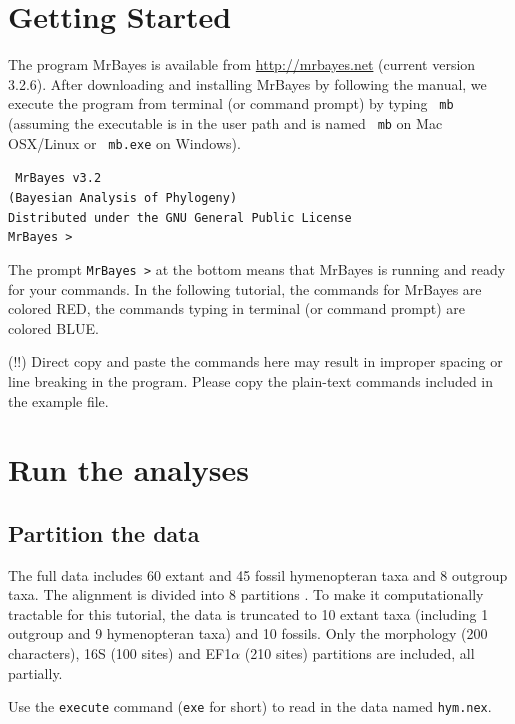 \documentclass[12pt]{article}
\begin{document}
\section{Getting Started}

The program MrBayes is available from \url{http://mrbayes.net} (current version 3.2.6).
After downloading and installing MrBayes by following the manual, we execute the program from terminal (or command prompt) by typing {\tt \color{blue} mb}
(assuming the executable is in the user path and is named {\tt \color{blue} mb} on Mac OSX/Linux or {\tt \color{blue} mb.exe} on Windows).

{\tt \center
                        MrBayes v3.2 \\
               (Bayesian Analysis of Phylogeny)\\
        Distributed under the GNU General Public License\\
MrBayes >
}

The prompt {\tt MrBayes >} at the bottom means that MrBayes is running and ready for your commands.
In the following tutorial, the commands for MrBayes are colored {\color{red} RED}, the commands typing in terminal (or command prompt) are colored {\color{blue} BLUE}.

{\noindent \color{red} (!!)}
Direct copy and paste the commands here may result in improper spacing or line breaking in the program. Please copy the plain-text commands included in the example file.

\section{Run the analyses}
\subsection{Partition the data}

The full data includes 60 extant and 45 fossil hymenopteran taxa and 8 outgroup taxa. The alignment is divided into 8 partitions \citep{Ronquist:2012ea}.
To make it computationally tractable for this tutorial, the data is truncated to 10 extant taxa (including 1 outgroup and 9 hymenopteran taxa) and 10 fossils.
Only the morphology (200 characters), 16S (100 sites) and EF1$\alpha$ (210 sites) partitions are included, all partially.

Use the {\tt execute} command ({\tt exe} for short) to read in the data named {\tt hym.nex}.
\end{document}

